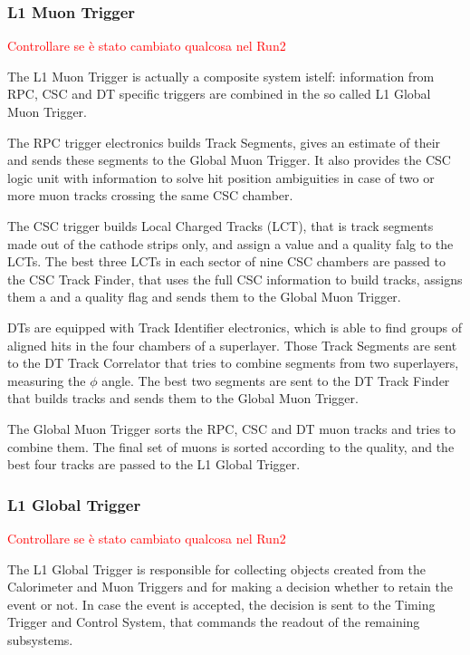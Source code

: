 \subsubsection{L1 Muon Trigger}
\textcolor{red}{Controllare se è stato cambiato qualcosa nel Run2}

The L1 Muon Trigger is actually a composite system istelf: information from RPC, CSC and DT specific triggers are combined in the so called L1 Global Muon Trigger. 

The RPC trigger electronics builds Track Segments, gives an estimate of their \pt and sends these segments to the Global Muon Trigger. It also provides the CSC logic unit with information to solve hit position ambiguities in case of two or more muon tracks crossing the same CSC chamber. 

The CSC trigger builds Local Charged Tracks (LCT), that is track segments made out of the cathode strips only, and assign a \pt value and a quality falg to the LCTs. The best three LCTs in each sector of nine CSC chambers are passed to the CSC Track Finder, that uses the full CSC information to build tracks, assigns them a \pt and a quality flag and sends them to the Global Muon Trigger.

DTs are equipped with Track Identifier electronics, which is able to find groups of aligned hits in the four chambers of a superlayer. Those Track Segments are sent to the DT Track Correlator that tries to combine segments from two superlayers, measuring the $\phi$ angle. The best two segments are sent to the DT Track Finder that builds tracks and sends them to the Global Muon Trigger.

The Global Muon Trigger sorts the RPC, CSC and DT muon tracks and tries to combine them. The final set of muons is sorted according to the quality, and the best four tracks are passed to the L1 Global Trigger.

\subsubsection{L1 Global Trigger}
\textcolor{red}{Controllare se è stato cambiato qualcosa nel Run2}

The L1 Global Trigger is responsible for collecting objects created from the Calorimeter and Muon Triggers and for making a decision whether to retain the event or not. In case the event is accepted, the decision is sent to the Timing Trigger and Control System, that commands the readout of the remaining subsystems.

